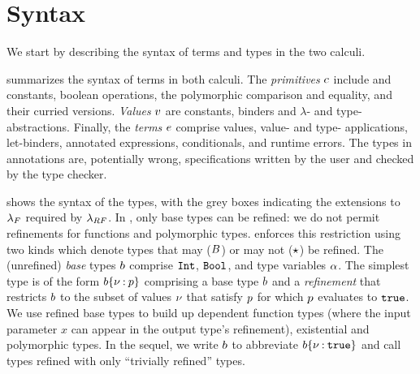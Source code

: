 \section{Syntax} \label{sec:lang:syntax}

We start by describing the syntax of terms and types 
in the two calculi.  

%
 summarizes the 
syntax of terms in both calculi.
%
%
The \emph{primitives} $c$
include \tint and \tbool constants, 
boolean operations, 
the polymorphic comparison and equality, 
and their curried versions.
%
%
\emph{Values} $v$ are 
constants, binders 
and $\lambda$- and type- abstractions.
%
Finally, the \emph{terms} $e$ comprise values,
value- and type- applications, let-binders, 
annotated expressions, conditionals, and runtime errors.
The types in annotations are, potentially wrong, specifications 
written by the user and checked by the type checker.  


%
 shows the syntax of the types,
with the grey boxes indicating the extensions to $\lambda_{F}$ 
required by $\lambda_{RF}$.
%
In \sysrf, only base types %
can be refined: we do not permit refinements 
for functions and polymorphic types. 
%
\sysrf enforces this restriction using two kinds
which denote types that may ($B$) or may not ($\star$)
be refined.
%
The (unrefined) \emph{base} types $b$ comprise 
$\texttt{Int}$, $\texttt{Bool}$, and type variables $\alpha$. 
%
The simplest type is of the form
${{b}\{\nu \mathbin{:} p\}}$ 
comprising a base type $b$ 
and a \emph{refinement} that restricts 
$b$ to the subset of values 
$\nu$ that satisfy $p$ \ie 
for which $p$ evaluates to $\mathtt{true}$.
%
We use refined base types to build up
dependent function types (where the input 
parameter $x$ can appear in the output type's 
refinement), existential and polymorphic 
types.
%
In the sequel, we write $b$ to abbreviate 
${{b}\{\nu \mathbin{:} \mathtt{true}\}}$
and call types refined with only \ttrue 
``trivially refined'' types. 

